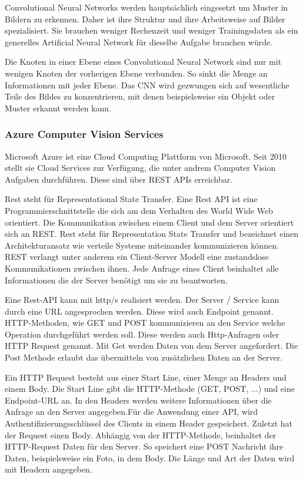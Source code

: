 Convolutional Neural Networks werden hauptsächlich eingesetzt um Muster in Bildern zu erkennen. Daher ist ihre Struktur und ihre Arbeitsweise auf Bilder spezialisiert. Sie brauchen weniger Rechenzeit und weniger Trainingsdaten als ein generelles Artificial Neural Network für dieselbe Aufgabe brauchen würde.\citep{introToCNN,surveyOfDeepLearing,cNNforClass} 

Die Knoten in einer Ebene eines Convolutional Neural Network sind nur mit wenigen Knoten der vorherigen Ebene verbunden. So sinkt die Menge an Informationen mit jeder Ebene. Das CNN wird gezwungen sich auf wesentliche Teile des Bildes zu konzentrieren, mit denen beispielsweise ein Objekt oder  Muster erkannt werden kann. \citep{introToCNN,surveyOfDeepLearing}

\subsubsection{Azure Computer Vision Services}

Microsoft Azure ist eine Cloud Computing Plattform von Microsoft. Seit 2010 stellt sie Cloud Services zur Verfügung, die unter andrem Computer Vision Aufgaben durchführen. 
Diese sind über REST APIs erreichbar. 

Rest steht für Representational State Transfer. Eine Rest API ist eine Programmierschnittstelle die sich am dem Verhalten des World Wide Web orientiert. Die Kommunikation zwischen einem Client und dem Server orientiert sich an REST.
Rest steht für Representation State Transfer und bezeichnet einen Architekturansatz wie verteile Systeme miteinander kommunizieren können. REST verlangt unter anderem ein Client-Server Modell eine zustandslose Kommunikationen zwischen ihnen. Jede Anfrage eines Client beinhaltet alle Informationen die der Server benötigt um sie zu beantworten. %

Eine Rest-API kann mit http/s realisiert werden. Der Server / Service kann durch eine URL angesprochen werden. Diese wird auch Endpoint genannt. HTTP-Methoden, wie GET und POST kommunizieren an den Service welche Operation durchgeführt werden soll. Diese werden auch Http-Anfragen oder HTTP Request genannt. Mit Get werden Daten von dem Server angefordert. Die Post Methode erlaubt das übermitteln von zusätzlichen Daten an der Server.

Ein HTTP Request besteht aus einer Start Line, einer Menge an Headers und einem Body. Die Start Line gibt die HTTP-Methode (GET, POST, ...) und eine Endpoint-URL an.
In den Headers werden weitere Informationen über die Anfrage an den Server angegeben.Für die Anwendung einer API, wird Authentifizierungsschlüssel des Clients in einem Header gespeichert.
Zuletzt hat der Request einen Body. Abhängig von der HTTP-Methode, beinhaltet der HTTP-Request Daten für den Server. So speichert eine POST Nachricht ihre Daten, beispielsweise ein Foto, in dem Body. Die Länge und Art der Daten wird mit Headern angegeben.
  
